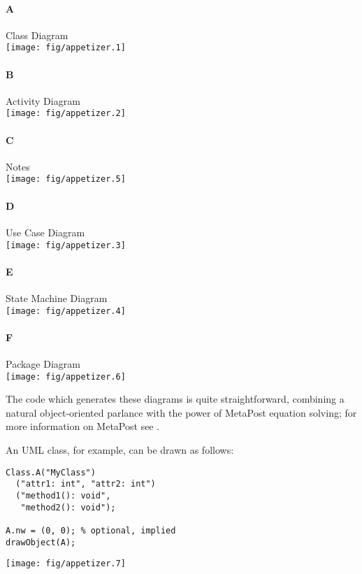 \documentclass{article}
\begin{document}
\begin{multicols}{2}
\paragraph{A} Class Diagram\\
\texttt{[image: fig/appetizer.1]}
\paragraph{B} Activity Diagram\\
\texttt{[image: fig/appetizer.2]}
\paragraph{C} Notes\\
\texttt{[image: fig/appetizer.5]}
\columnbreak
\paragraph{D} Use Case Diagram\\
\texttt{[image: fig/appetizer.3]}
\paragraph{E} State Machine Diagram\\
\texttt{[image: fig/appetizer.4]}
\paragraph{F} Package Diagram\\
\texttt{[image: fig/appetizer.6]}
\end{multicols}

\pagebreak

The code which generates these diagrams is quite straightforward, combining a natural object-oriented parlance with the power of MetaPost equation solving; for more information on MetaPost see \cite {metapost}.

An UML class, for example, can be drawn as follows:

\begin{multicols}{2}
\begin{verbatim}
Class.A("MyClass")
  ("attr1: int", "attr2: int")
  ("method1(): void",
   "method2(): void");

A.nw = (0, 0); % optional, implied
drawObject(A);
\end{verbatim}
\columnbreak
\hspace{1cm}\texttt{[image: fig/appetizer.7]}
\end{multicols}
\end{document}
